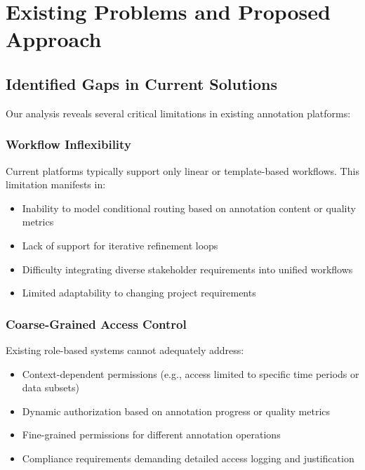 \section{Existing Problems and Proposed Approach}
\label{sec:problems-approach}

\subsection{Identified Gaps in Current Solutions}

Our analysis reveals several critical limitations in existing annotation platforms:

\subsubsection{Workflow Inflexibility}

Current platforms typically support only linear or template-based workflows. This limitation manifests in:

\begin{itemize}
    \item Inability to model conditional routing based on annotation content or quality metrics
    \item Lack of support for iterative refinement loops
    \item Difficulty integrating diverse stakeholder requirements into unified workflows
    \item Limited adaptability to changing project requirements
\end{itemize}

\subsubsection{Coarse-Grained Access Control}

Existing role-based systems cannot adequately address:

\begin{itemize}
    \item Context-dependent permissions (e.g., access limited to specific time periods or data subsets)
    \item Dynamic authorization based on annotation progress or quality metrics
    \item Fine-grained permissions for different annotation operations
    \item Compliance requirements demanding detailed access logging and justification
\end{itemize}

